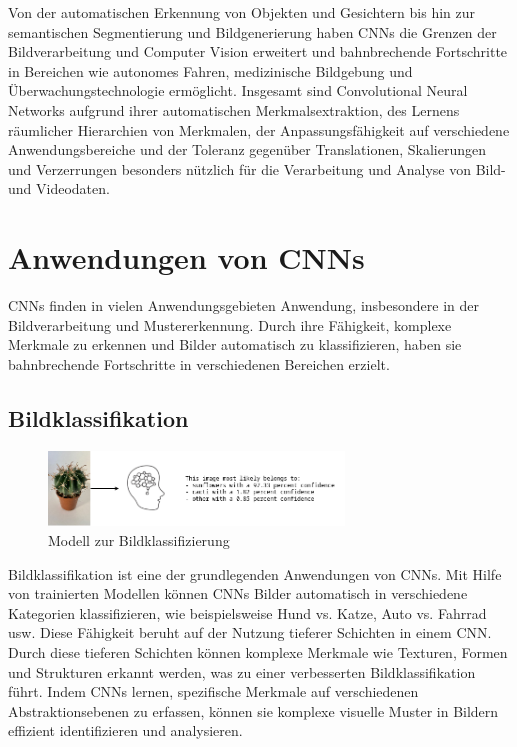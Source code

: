     
    Von der automatischen Erkennung von Objekten und Gesichtern bis hin zur semantischen Segmentierung und Bildgenerierung haben \acp{CNN} die Grenzen der Bildverarbeitung und Computer Vision erweitert und bahnbrechende Fortschritte in Bereichen wie autonomes Fahren, medizinische Bildgebung und Überwachungstechnologie ermöglicht.
    Insgesamt sind Convolutional Neural Networks aufgrund ihrer automatischen Merkmalsextraktion, des Lernens räumlicher Hierarchien von Merkmalen, der Anpassungsfähigkeit auf verschiedene Anwendungsbereiche und der Toleranz gegenüber Translationen, Skalierungen und Verzerrungen besonders nützlich für die Verarbeitung und Analyse von Bild- und Videodaten.

\section{Anwendungen von CNNs}

	\acfp{CNN} finden in vielen Anwendungsgebieten Anwendung, insbesondere in der Bildverarbeitung und Mustererkennung.
	Durch ihre Fähigkeit, komplexe Merkmale zu erkennen und Bilder automatisch zu klassifizieren, haben sie bahnbrechende Fortschritte in verschiedenen Bereichen erzielt.

\subsection{Bildklassifikation}

    \begin{figure}[h]
        \centering
        \includegraphics[width=0.7\textwidth]{img/model_sagt_aus.png}
        \caption{Modell zur Bildklassifizierung}
        \label{fig:modell_sagt_aus}
    \end{figure}

    Bildklassifikation ist eine der grundlegenden Anwendungen von \acp{CNN}. 
    Mit Hilfe von trainierten Modellen können \acp{CNN} Bilder automatisch in verschiedene Kategorien klassifizieren, wie beispielsweise Hund vs. Katze, Auto vs. Fahrrad usw. Diese Fähigkeit beruht auf der Nutzung tieferer Schichten in einem CNN. 
    Durch diese tieferen Schichten können komplexe Merkmale wie Texturen, Formen und Strukturen erkannt werden, was zu einer verbesserten Bildklassifikation führt. 
    Indem \acp{CNN} lernen, spezifische Merkmale auf verschiedenen Abstraktionsebenen zu erfassen, können sie komplexe visuelle Muster in Bildern effizient identifizieren und analysieren.
    
